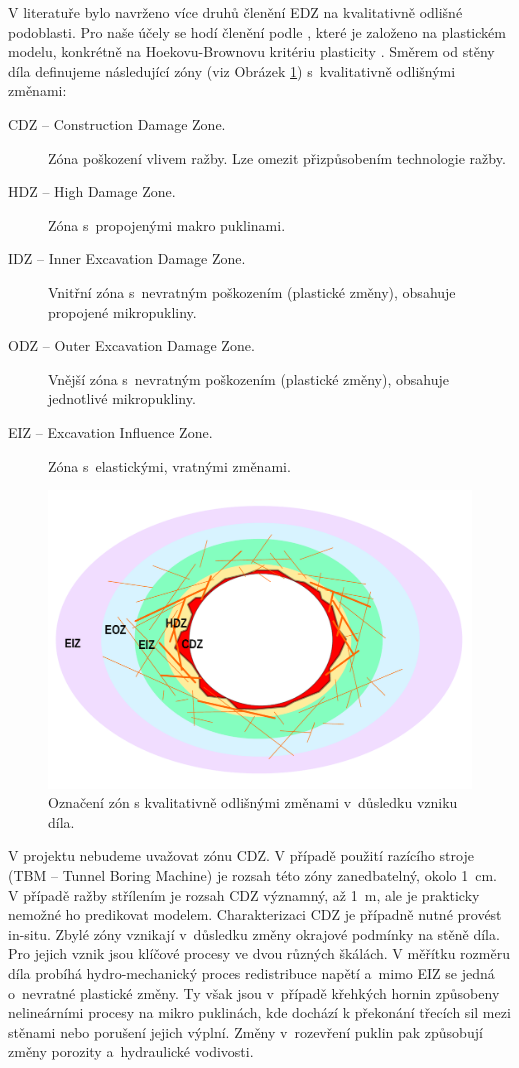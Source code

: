 \documentclass{article}
\begin{document}
V literatuře bylo navrženo více druhů členění EDZ na kvalitativně odlišné podoblasti. Pro naše účely se hodí členění podle \cite{Perras2016}, 
které je založeno na plastickém modelu, konkrétně na Hoekovu-Brownovu kritériu plasticity \cite{Hoek2002}. Směrem od stěny díla definujeme následující zóny (viz Obrázek \ref{fig:edz_zones}) s~kvalitativně odlišnými změnami:
\begin{description}
\item[CDZ -- Construction Damage Zone.] Zóna poškození vlivem ražby. Lze omezit přizpůsobením technologie ražby.
\item[HDZ -- High Damage Zone.] Zóna s~propojenými makro puklinami. 
\item[IDZ -- Inner Excavation Damage Zone.] Vnitřní zóna s~nevratným poškozením (plastické změny), obsahuje propojené mikropukliny.
\item[ODZ -- Outer Excavation Damage Zone.] Vnější zóna s~nevratným poškozením (plastické změny), obsahuje jednotlivé mikropukliny.
\item[EIZ -- Excavation Influence Zone.] Zóna s~elastickými, vratnými změnami.
\end{description}


\begin{figure}
    \centering
    \includegraphics[width=\textwidth]{graphics/EDZ_structure.pdf}
    \caption{Označení zón s kvalitativně odlišnými změnami v~důsledku vzniku díla.}
    \label{fig:edz_zones}
\end{figure}

V projektu nebudeme uvažovat zónu CDZ. V případě použití razícího stroje (TBM -- Tunnel Boring Machine) je rozsah této zóny zanedbatelný, okolo 1~cm. V případě 
ražby střílením je rozsah CDZ významný, až 1~m, ale je prakticky nemožné ho predikovat modelem. Charakterizaci CDZ je případně nutné provést in-situ.
Zbylé zóny vznikají v~důsledku změny okrajové podmínky na stěně díla. Pro jejich vznik jsou klíčové procesy ve dvou různých škálách. V měřítku rozměru 
díla probíhá hydro-mechanický proces redistribuce napětí a~mimo EIZ se jedná o~nevratné plastické změny. Ty však jsou v~případě křehkých hornin
způsobeny nelineárními procesy na mikro puklinách, kde dochází k překonání třecích sil mezi stěnami nebo porušení jejich výplní. 
Změny v~rozevření puklin pak způsobují změny porozity a~hydraulické vodivosti. 
\end{document}
